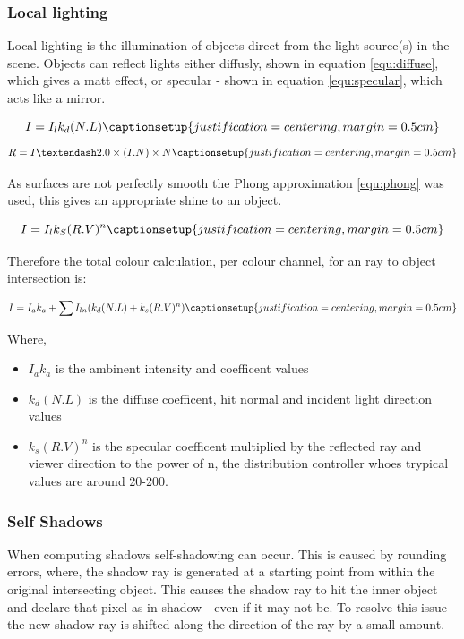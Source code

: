 \documentclass{article}
\begin{document}
\subsubsection{Local lighting}
Local lighting is the illumination of objects direct from the light source(s) in the scene. Objects can reflect lights either diffusly, shown in equation \ref{equ:diffuse}, which gives a matt effect, or specular - shown in equation \ref{equ:specular}, which acts like a mirror. 

\begin{equation}
I = I_lk_d(N.L)
\captionsetup{justification=centering,margin=0.5cm}
\label{equ:diffuse}
\end{equation}
\begin{equation}
R = I –2.0 \times (I.N) \times N
\captionsetup{justification=centering,margin=0.5cm}
\label{equ:specular}
\end{equation}

As surfaces are not perfectly smooth the Phong approximation \ref{equ:phong} was used, this gives an appropriate shine to an object.

\begin{equation}
I = I_lk_S(R.V)^n
\captionsetup{justification=centering,margin=0.5cm}
\label{equ:phong}
\end{equation}

Therefore the total colour calculation, per colour channel, for an ray to object intersection is:

\begin{equation}
I = I_ak_a + \sum I_{ln}(k_d(N.L) + k_s(R.V)^n)
\captionsetup{justification=centering,margin=0.5cm}
\label{equ:totalColour}
\end{equation}

Where,
\begin{itemize}
\item $ I_ak_a $ is the ambinent intensity and coefficent values
\item $ k_d(N.L)  $ is the diffuse coefficent, hit normal and incident light direction values
\item $ k_s(R.V)^n $ is the specular coefficent multiplied by the reflected ray and viewer direction to the power of n, the distribution controller whoes trypical values are around 20-200.
\end{itemize}

\subsubsection{Self Shadows}
When computing shadows self-shadowing can occur. This is caused by rounding errors, where, the shadow ray is generated at a starting point from within the original intersecting object. This causes the shadow ray to hit the inner object and declare that pixel as in shadow - even if it may not be. To resolve this issue the new shadow ray is shifted along the direction of the ray by a small amount. 
\end{document}
